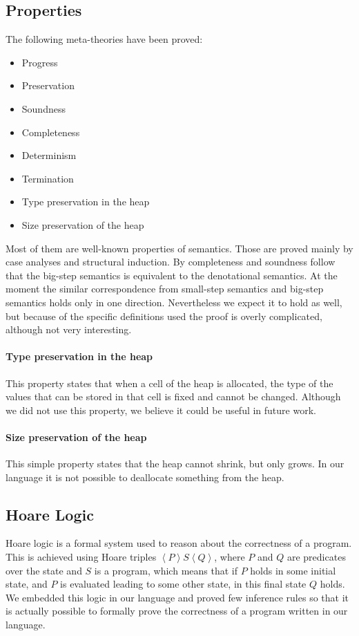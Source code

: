 \documentclass[12pt, a4paper, oneside]{article}
\begin{document}
\subsection{Properties}
\label{sec:metatheories}
The following meta-theories have been proved:
\begin{itemize}
	\item Progress
	\item Preservation
	\item Soundness
	\item Completeness
	\item Determinism
	\item Termination
	\item Type preservation in the heap
	\item Size preservation of the heap
\end{itemize}

Most of them are well-known properties of semantics. Those are proved mainly by case analyses and structural induction. By completeness and soundness follow that the big-step semantics is equivalent to the denotational semantics. At the moment the similar correspondence from small-step semantics and big-step semantics holds only in one direction. Nevertheless we expect it to hold as well, but because of the specific definitions used the proof is overly complicated, although not very interesting.

\paragraph{Type preservation in the heap}
This property states that when a cell of the heap is allocated, the type of the values that can be stored in that cell is fixed and cannot be changed. Although we did not use this property, we believe it could be useful in future work.

\paragraph{Size preservation of the heap}
This simple property states that the heap cannot shrink, but only grows.
In our language it is not possible to deallocate something from the heap.

\subsection{Hoare Logic}
Hoare logic is a formal system used to reason about the correctness of a program. 
This is achieved using Hoare triples $\left\langle P \right\rangle   S \left\langle Q \right\rangle$, where $P$ and $Q$ are predicates over the state and $S$ is a program, which means that if $P$ holds in some initial state, and $P$ is evaluated leading to some other state, in this final state $Q$ holds.
We embedded this logic in our language and proved few inference rules so that it is actually possible to formally prove the correctness of a program written in our language.
\end{document}
